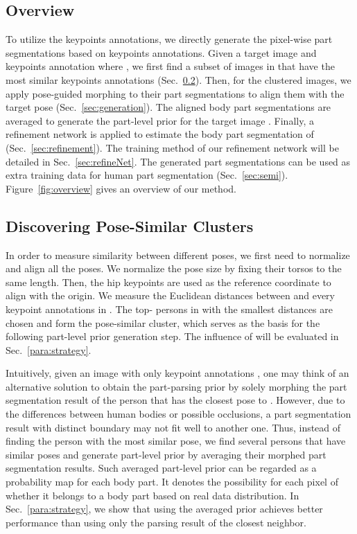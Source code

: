 \documentclass[10pt,twocolumn,letterpaper]{article}
\begin{document}
\subsection{Overview}
To utilize the keypoints annotations, we directly generate the pixel-wise part segmentations based on keypoints annotations. Given a target image  and keypoints annotation  where , we first find a subset of images in  that have the most similar keypoints annotations (Sec.~\ref{sec:cluster}). Then, for the clustered images, we apply pose-guided morphing to their part segmentations to align them with the target pose (Sec.~\ref{sec:generation}). The aligned body part segmentations are averaged to generate the part-level prior for the target image . Finally, a refinement network is applied to estimate the body part segmentation of  (Sec.~\ref{sec:refinement}). The training method of our refinement network will be detailed in Sec.~\ref{sec:refineNet}. The generated part segmentations can be used as extra training data for human part segmentation (Sec.~\ref{sec:semi}).  Figure~\ref{fig:overview} gives an overview of our method.

\subsection{Discovering Pose-Similar Clusters}
\label{sec:cluster}
In order to measure similarity between different poses, we first need to normalize and align all the poses. We normalize the pose size by fixing their torsos to the same length. Then, the hip keypoints are used as the reference coordinate to align with the origin. We measure the Euclidean distances between  and every keypoint annotations in . The top- persons in  with the smallest distances are chosen and form the pose-similar cluster, which serves as the basis for the following part-level prior generation step. The influence of  will be evaluated in Sec.~\ref{para:strategy}.

Intuitively, given an image  with only keypoint annotations , one may think of an alternative solution to obtain the part-parsing prior by solely morphing the part segmentation result of the person that has the closest pose to . However, due to the differences between human bodies or possible occlusions, a part segmentation result with distinct boundary may not fit well to another one. Thus, instead of finding the person with the most similar pose, we find several persons that have similar poses and generate part-level prior by averaging their morphed part segmentation results. Such averaged part-level prior can be regarded as a probability map for each body part. It denotes the possibility for each pixel of whether it belongs to a body part based on real data distribution. In Sec.~\ref{para:strategy}, we show that using the averaged prior achieves better performance than using only the parsing result of the closest neighbor.
\end{document}
